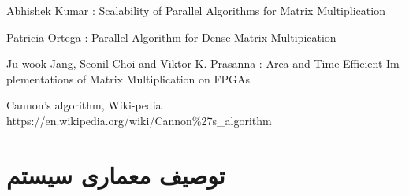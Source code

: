 \documentclass[12pt,onecolumn,a4paper,fleqn]{article}
\begin{document}
\begin{latin}
\begin{thebibliography}{}
	
	Abhishek Kumar : Scalability of Parallel Algorithms for Matrix Multiplication
	
	Patricia Ortega : Parallel Algorithm for Dense Matrix Multipication
	
	Ju-wook Jang, Seonil Choi and Viktor K. Prasanna : Area and Time Efficient Implementations of Matrix Multiplication on FPGAs
	
	Cannon's algorithm, Wiki-pedia\\ https://en.wikipedia.org/wiki/Cannon\%27s\_algorithm
	
	
\end{thebibliography}
\end{latin}

\pagebreak

\section{توصیف معماری سیستم}
\end{document}
